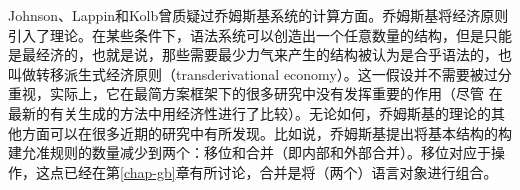 Johnson、Lappin和Kolb曾质疑过乔姆斯基系统的计算方面。乔姆斯基将经济原则引入了理论。在某些条件下，语法系统可以创造出一个任意数量的结构，但是只能是最经济的，也就是说，那些需要最少力气来产生的结构被认为是合乎语法的，也叫做转移派生式经济原则（transderivational economy）。这一假设并不需要被过分重视，实际上，它在最简方案框架下的很多研究中没有发挥重要的作用（尽管 \citet{Richards2015a}在最新的有关生成的方法中用经济性进行了比较）。无论如何，乔姆斯基的理论的其他方面可以在很多近期的研究中有所发现。比如说，乔姆斯基提出将基本结构的构建允准规则的数量减少到两个：移位和合并（即内部和外部合并）。移位对应于\moveac 操作，这点已经在第\ref{chap-gb}章有所讨论，合并是将（两个）语言对象进行组合。

